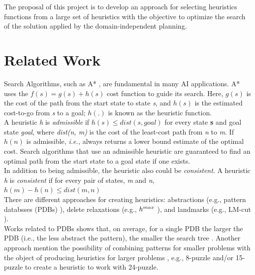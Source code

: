 \documentclass[a4paper,12pt]{article}
\begin{document}
The proposal of this project is to develop an approach for selecting heuristics functions from a large set of heuristics with the objective to optimize the search of the solution applied by the domain-independent planning.

\section{Related Work}
Search Algorithms, such as A* \citep{hart1968formal}, are fundamental in many AI applications. A* uses the $f(s) = g(s) + h(s)$ cost function to guide its search. Here, $g(s)$ is the cost of the path from the start state to state \textit{s}, and $h(s)$ is the estimated cost-to-go from \textit{s} to a goal; $h(.)$ is known as the heuristic function.\\

 A heuristic \textit{h} is \textit{admissible} if $h(s) \leq dist(s, goal)$ for every state \textbf{s} and goal state \textit{goal}, where \textit{dist(n, m)} is the cost of the least-cost path from \textit{n} to \textit{m}. If $h(n)$ is admissible, \textit{i.e.,} always returns a lower bound estimate of the optimal cost. Search algorithms that use an admissible heuristic are guaranteed to find an optimal path from the start state to a goal state if one exists.\\

In addition to being admissible, the heuristic also could be \textit{consistent}. A heuristic \textit{h} is \textit{consistent} if for every pair of states, \textit{m} and \textit{n}, $h(m) - h(n) \leq dist(m, n)$\\

There are different approaches for creating heuristics: abstractions (e.g., pattern databsses (PDBs) \citep{culberson1996searching}), delete relaxations (e.g., $h\sp{max}$ \citep{bonet2001planning}), and landmarks (e.g., LM-cut \citep{helmert2009landmarks}).\\

Works related to PDBs shows that, on average, for a single PDB the larger the PDB (i.e., the less abstract the pattern), the smaller the search tree \citep{holte1999space}. Another approach mention the possibility of combining patterns for smaller problems with the object of producing heuristics for larger problems \citep{culberson1998pattern}, e.g., 8-puzzle and/or 15-puzzle to create a heuristic to work with 24-puzzle.\\
\end{document}
